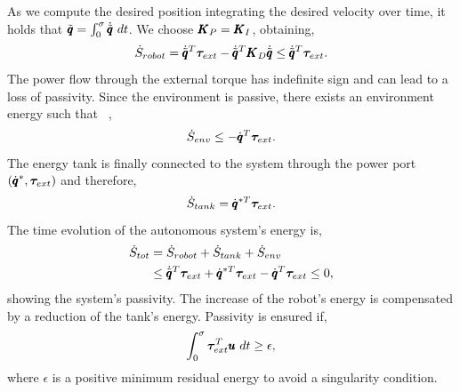 As we compute the desired position integrating the desired velocity over time, it holds that $\tilde{\pmb{q}} = \int^{\sigma}_{0}
\dot{\tilde{\pmb{q}}}\ dt$. We choose $\pmb{K}_P = \pmb{K}_I$, obtaining,
\begin{equation}
    \dot{S}_{robot} = \dot{\tilde{\pmb{q}}}^T \boldsymbol{\tau}_{ext} - \dot{\tilde{\pmb{q}}}^T \pmb{K}_D \dot{\tilde{\pmb{q}}} \leq \dot{\tilde{\pmb{q}}}^T \boldsymbol{\tau}_{ext}. 
\end{equation}
The power flow through the external torque has indefinite sign and can lead to a loss of passivity. Since the environment is passive, there exists an environment energy such that ~\cite{shahriari2018valve},
\begin{equation}
    \dot{S}_{env} \leq -\dot{\pmb{q}}^T \boldsymbol{\tau}_{ext}.
\end{equation}
The energy tank is finally connected to the system through the power port $(\dot{\pmb{q}}^*, \boldsymbol{\tau}_{ext})$ and therefore,
\begin{equation} \label{eq:tank_dynamics}
\dot{S}_{tank} = \dot{\pmb{q}}^{*T} \boldsymbol{\tau}_{ext}. 
\end{equation}
The time evolution of the autonomous system's energy is,
\begin{equation}
\begin{aligned}
    \dot{S}_{tot} &= \dot{S}_{robot} + \dot{S}_{tank} + \dot{S}_{env} \\
    &\leq \dot{\tilde{\pmb{q}}}^T \boldsymbol{\tau}_{ext} + \dot{\pmb{q}}^{*T} \boldsymbol{\tau}_{ext} - \dot{\pmb{q}}^T \boldsymbol{\tau}_{ext} \leq 0,
\end{aligned}
\end{equation}
showing the system's passivity. The increase of the robot's energy is compensated by a reduction of the tank's energy. Passivity is ensured if,
\begin{equation}
    \int_{0}^{\sigma} \boldsymbol{\tau}_{ext}^T \pmb{u} \ dt \geq \epsilon,
\end{equation}
where $\epsilon$ is a positive minimum residual energy to avoid a singularity condition.

